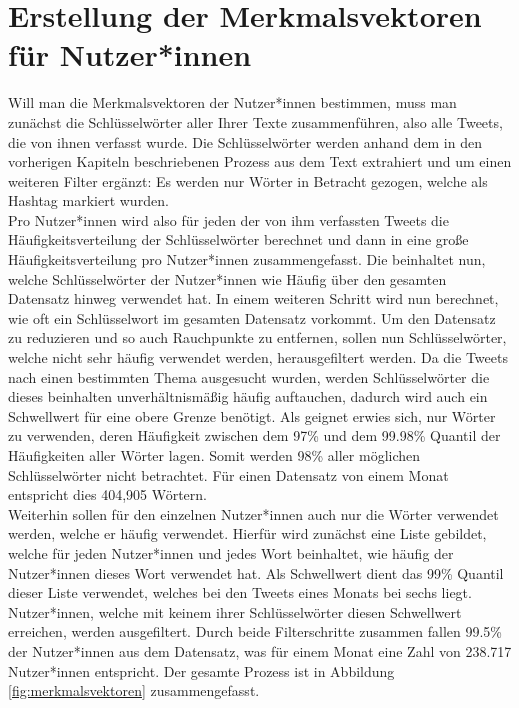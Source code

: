 \section{Erstellung der Merkmalsvektoren für Nutzer*innen}
\label{sec:merkmalsvektoren}
Will man die Merkmalsvektoren der Nutzer*innen bestimmen, muss man zunächst die Schlüsselwörter aller Ihrer Texte zusammenführen, also alle Tweets, die von ihnen verfasst wurde. Die Schlüsselwörter werden anhand dem in den vorherigen Kapiteln beschriebenen Prozess aus dem Text extrahiert und um einen weiteren Filter ergänzt: Es werden nur Wörter in Betracht gezogen, welche als Hashtag markiert wurden. \\ \newline
Pro Nutzer*innen wird also für jeden der von ihm verfassten Tweets die Häufigkeitsverteilung der Schlüsselwörter berechnet und dann in eine große Häufigkeitsverteilung pro Nutzer*innen zusammengefasst. Die beinhaltet nun, welche Schlüsselwörter der Nutzer*innen wie Häufig über den gesamten Datensatz hinweg verwendet hat. In einem weiteren Schritt wird nun berechnet, wie oft ein Schlüsselwort im gesamten Datensatz vorkommt. Um den Datensatz zu reduzieren und so auch Rauchpunkte zu entfernen, sollen nun Schlüsselwörter, welche nicht sehr häufig verwendet werden, herausgefiltert werden. Da die Tweets nach einen bestimmten Thema ausgesucht wurden, werden Schlüsselwörter die dieses beinhalten unverhältnismäßig häufig auftauchen, dadurch wird auch ein Schwellwert für eine obere Grenze benötigt. Als geignet erwies sich, nur Wörter zu verwenden, deren Häufigkeit zwischen dem 97\% und dem 99.98\% Quantil der Häufigkeiten aller Wörter lagen. Somit werden 98\% aller möglichen Schlüsselwörter nicht betrachtet. Für einen Datensatz von einem Monat entspricht dies 404,905 Wörtern. \\ \newline
Weiterhin sollen für den einzelnen Nutzer*innen auch nur die Wörter verwendet werden, welche er häufig verwendet. Hierfür wird zunächst eine Liste gebildet, welche  für jeden Nutzer*innen und jedes Wort beinhaltet, wie häufig der Nutzer*innen dieses Wort verwendet hat. Als Schwellwert dient das 99\% Quantil dieser Liste verwendet, welches bei den Tweets eines Monats bei sechs liegt. Nutzer*innen, welche mit keinem ihrer Schlüsselwörter diesen Schwellwert erreichen, werden ausgefiltert. Durch beide Filterschritte zusammen fallen 99.5\% der Nutzer*innen aus dem Datensatz, was für einem Monat eine Zahl von 238.717 Nutzer*innen entspricht. Der gesamte Prozess ist in Abbildung \ref{fig:merkmalsvektoren} zusammengefasst.
